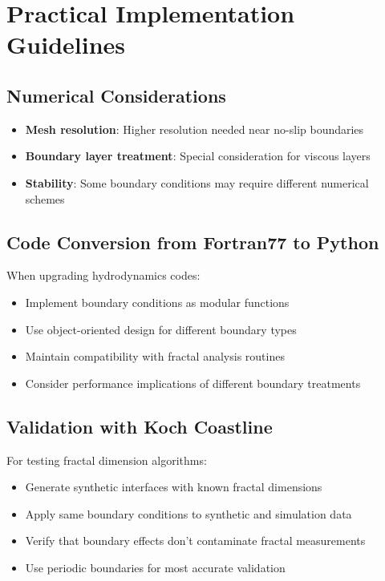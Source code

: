 \documentclass[12pt,a4paper]{article}
\begin{document}
\section{Practical Implementation Guidelines}

\subsection{Numerical Considerations}
\begin{itemize}
    \item \textbf{Mesh resolution}: Higher resolution needed near no-slip boundaries
    \item \textbf{Boundary layer treatment}: Special consideration for viscous layers
    \item \textbf{Stability}: Some boundary conditions may require different numerical schemes
\end{itemize}

\subsection{Code Conversion from Fortran77 to Python}
When upgrading hydrodynamics codes:
\begin{itemize}
    \item Implement boundary conditions as modular functions
    \item Use object-oriented design for different boundary types
    \item Maintain compatibility with fractal analysis routines
    \item Consider performance implications of different boundary treatments
\end{itemize}

\subsection{Validation with Koch Coastline}
For testing fractal dimension algorithms:
\begin{itemize}
    \item Generate synthetic interfaces with known fractal dimensions
    \item Apply same boundary conditions to synthetic and simulation data
    \item Verify that boundary effects don't contaminate fractal measurements
    \item Use periodic boundaries for most accurate validation
\end{itemize}
\end{document}
